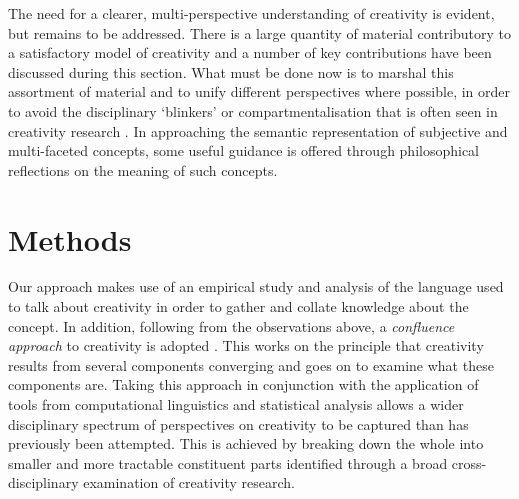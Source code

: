 \documentclass[10pt,letterpaper]{article}
\begin{document}

The need for a clearer, multi-perspective understanding of creativity is evident, but remains to be addressed. There is a large quantity of material contributory to a satisfactory model of creativity and a number of key contributions have been discussed during this section. What must be done now is to marshal this assortment of material and to unify different perspectives where possible, in order to avoid the disciplinary `blinkers' or compartmentalisation that is often seen in creativity research \cite{hennessey10}. In approaching the semantic representation of subjective and multi-faceted concepts, some useful guidance is offered through philosophical reflections on the meaning of such concepts. 


\section*{Methods}
\label{methodology}

Our approach makes use of an empirical study and analysis of the language used to talk about creativity in order to gather and collate knowledge about the concept. In addition, following from the observations above, a {\em  confluence approach\/} to creativity is adopted \cite{sternberg99a,mayer99,ivcevic09}. This works on the principle that creativity results from several components converging and goes on to examine what these components are. Taking this approach in conjunction with the application of tools from computational linguistics and statistical analysis allows a wider disciplinary spectrum of perspectives on creativity to be captured than has previously been attempted. This is achieved by breaking down the whole into smaller and more tractable constituent parts identified through a broad cross-disciplinary examination of creativity research. 
\end{document}
